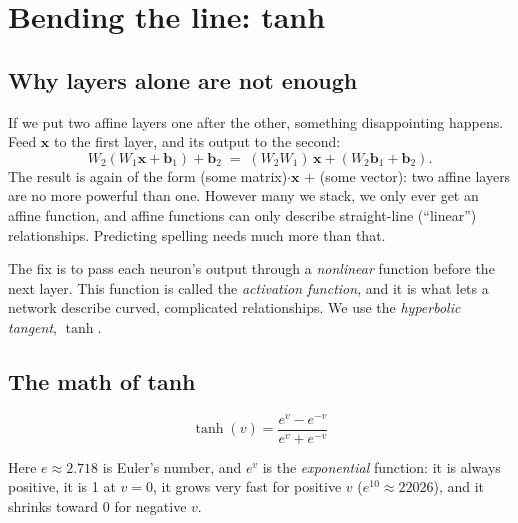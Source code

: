 \documentclass[11pt,a4paper,oneside,openany]{book}
\newcommand{\vect}[1]{\mathbf{#1}}
\begin{document}
\chapter{Bending the line: tanh}

\section{Why layers alone are not enough}

If we put two affine layers one after the other, something disappointing
happens. Feed $\vect{x}$ to the first layer, and its output to the second:
\[
  W_2(W_1\vect{x} + \vect{b}_1) + \vect{b}_2
  \;=\; (W_2 W_1)\,\vect{x} + (W_2\vect{b}_1 + \vect{b}_2).
\]
The result is again of the form (some matrix)$\cdot\vect{x}$ + (some
vector): two affine layers are no more powerful than one. However many we
stack, we only ever get an affine function, and affine functions can only
describe straight-line (``linear'') relationships. Predicting spelling
needs much more than that.

The fix is to pass each neuron's output through a \emph{nonlinear}
function before the next layer. This function is called the
\emph{activation function}, and it is what lets a network describe curved,
complicated relationships. We use the \emph{hyperbolic tangent}, $\tanh$.

\section{The math of tanh}

\begin{mathbox}
\[
  \tanh(v) = \frac{e^{v} - e^{-v}}{e^{v} + e^{-v}}
\]
\end{mathbox}

Here $e \approx 2.718$ is Euler's number, and $e^v$ is the
\emph{exponential} function: it is always positive, it is 1 at $v=0$, it
grows very fast for positive $v$ ($e^{10}\approx 22026$), and it shrinks
toward 0 for negative $v$.

\begin{center}
\end{center}
\end{document}

